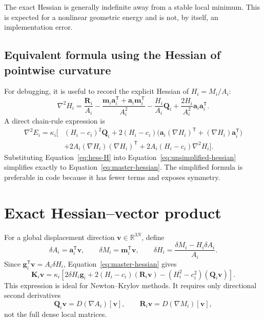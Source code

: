 \documentclass[11pt]{article}
\newcommand{\R}{\mathbb{R}}
\newcommand{\T}{\mathsf{T}}
\newcommand{\grad}{\nabla}
\newcommand{\Hess}{\nabla^2}
\newcommand{\vct}{\mathbf{v}}
\newcommand{\aV}{\mathbf{a}}
\newcommand{\mV}{\mathbf{m}}
\newcommand{\gV}{\mathbf{g}}
\newcommand{\Q}{\mathbf{Q}}
\newcommand{\Mmat}{\mathbf{R}}
\newcommand{\Kmat}{\mathbf{K}}
\begin{document}
The exact Hessian is generally indefinite away from a stable local minimum.  This is expected for a nonlinear geometric energy and is not, by itself, an implementation error.

\subsection{Equivalent formula using the Hessian of pointwise curvature}

For debugging, it is useful to record the explicit Hessian of $H_i=M_i/A_i$:
\begin{equation}
  \boxed{
  \Hess H_i
  =
  \frac{\Mmat_i}{A_i}
  -\frac{\mV_i\aV_i^\T+\aV_i\mV_i^\T}{A_i^2}
  -\frac{H_i}{A_i}\Q_i
  +\frac{2H_i}{A_i^2}\aV_i\aV_i^\T.}
  \label{eq:hess-H}
\end{equation}
A direct chain-rule expression is
\begin{align}
  \Hess E_i
  =\kappa_i\bigl[
    &(H_i-c_i)^2\Q_i
    +2(H_i-c_i)
      \bigl(\aV_i(\grad H_i)^\T+(\grad H_i)\aV_i^\T\bigr)\\
    &+2A_i(\grad H_i)(\grad H_i)^\T
    +2A_i(H_i-c_i)\Hess H_i
  \bigr].
  \label{eq:unsimplified-hessian}
\end{align}
Substituting Equation~\eqref{eq:hess-H} into Equation~\eqref{eq:unsimplified-hessian} simplifies exactly to Equation~\eqref{eq:master-hessian}.  The simplified formula is preferable in code because it has fewer terms and exposes symmetry.

\section{Exact Hessian--vector product}

For a global displacement direction $\vct\in\R^{3N}$, define
\begin{equation}
  \delta A_i=\aV_i^\T\vct,
  \qquad
  \delta M_i=\mV_i^\T\vct,
  \qquad
  \delta H_i=\frac{\delta M_i-H_i\delta A_i}{A_i}.
  \label{eq:directional-primitives}
\end{equation}
Since $\gV_i^\T\vct=A_i\delta H_i$, Equation~\eqref{eq:master-hessian} gives
\begin{equation}
  \boxed{
  \Kmat_i\vct
  =\kappa_i\left[
      2\delta H_i\gV_i
      +2(H_i-c_i)(\Mmat_i\vct)
      -(H_i^2-c_i^2)(\Q_i\vct)
    \right].}
  \label{eq:hvp}
\end{equation}
This expression is ideal for Newton--Krylov methods.  It requires only directional second derivatives
\begin{equation}
  \Q_i\vct=D(\grad A_i)[\vct],
  \qquad
  \Mmat_i\vct=D(\grad M_i)[\vct],
\end{equation}
not the full dense local matrices.
\end{document}
